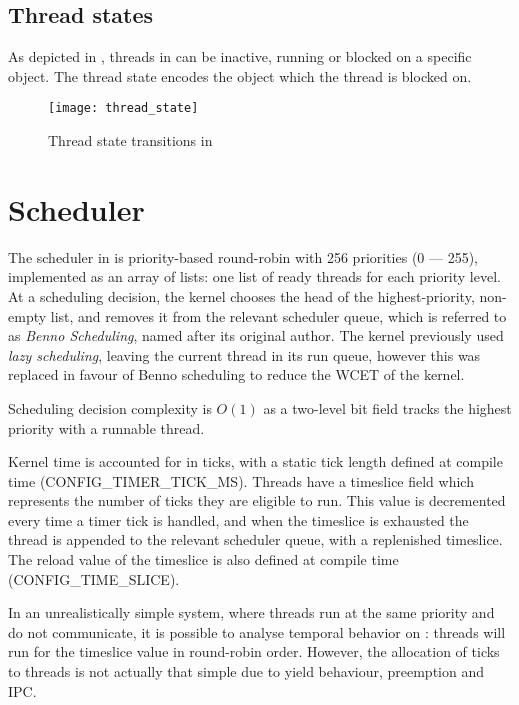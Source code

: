 \subsection{Thread states}

As depicted in , threads in \selfour can be inactive, running or blocked on a
specific object. The thread state encodes the object which the thread is blocked on. 

\begin{figure}[h!tb]
    \centering
    \texttt{[image: thread\_state]}
    \caption{Thread state transitions in \selfour}
    \label{f:thread_state}
\end{figure}


\section{Scheduler}

The scheduler in \selfour is priority-based round-robin with 256 priorities (0 --- 255), implemented as an array of lists: one list of ready threads for each priority level. 
At a scheduling decision, the kernel chooses the head of the highest-priority, non-empty list, and
removes it from the relevant scheduler queue, which is referred to as \emph{Benno Scheduling}, named
after its original author.
The kernel previously used \emph{lazy scheduling}, leaving the current thread in its run queue, however this was replaced in favour of Benno scheduling to reduce the WCET of the kernel. 

Scheduling decision complexity is $O(1)$ as a two-level bit field tracks the highest priority with a runnable thread.

Kernel time is accounted for in ticks, with a static tick length defined at compile time (CONFIG\_TIMER\_TICK\_MS).
Threads have a timeslice field which represents the number of ticks they are eligible to run. 
This value is decremented every time a timer tick is handled, and when the timeslice is exhausted the thread is appended to the relevant scheduler queue, with a replenished timeslice.
The reload value of the timeslice is also defined at compile time (CONFIG\_TIME\_SLICE).

In an unrealistically simple system, where threads run at the same priority and do not communicate, it is possible to analyse temporal behavior on \selfour: threads will run for the timeslice value in round-robin order.
However, the allocation of ticks to threads is not actually that simple due to yield behaviour, preemption and \gls{IPC}. 

